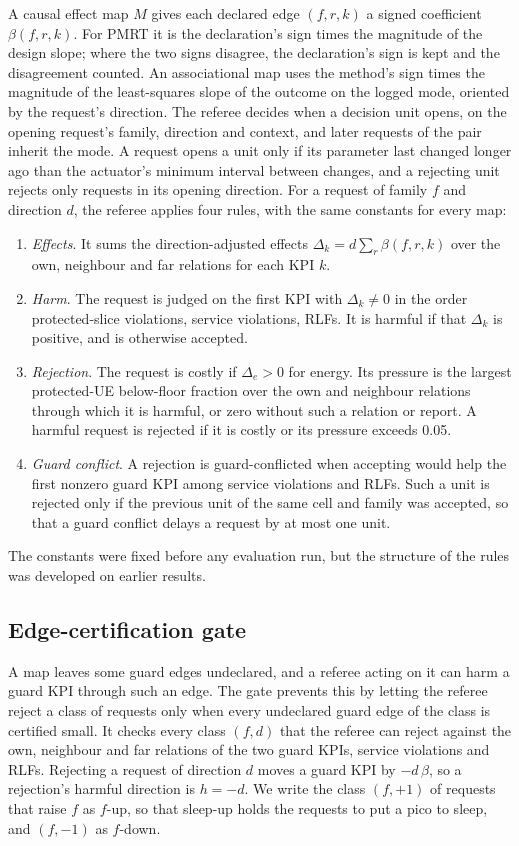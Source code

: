 A causal effect map $M$ gives each declared edge $(f, r, k)$ a signed coefficient $\beta(f, r, k)$. For PMRT it is the
declaration's sign times the magnitude of the design slope; where the two signs disagree, the declaration's sign is
kept and the disagreement counted. An associational map uses the method's sign times the magnitude of the
least-squares slope of the outcome on the logged mode, oriented by the request's direction. The referee decides when a
decision unit opens, on the opening request's family, direction and context, and later requests of the pair inherit
the mode. A request opens a unit only if its parameter last changed longer ago than the actuator's minimum interval
between changes, and a rejecting unit rejects only requests in its opening direction. For a request of family $f$ and
direction $d$, the referee applies four rules, with the same constants for every map:
\begin{enumerate}
\item \emph{Effects}. It sums the direction-adjusted effects $\Delta_k = d \sum_r \beta(f, r, k)$ over the own,
neighbour and far relations for each KPI $k$.
\item \emph{Harm}. The request is judged on the first KPI with $\Delta_k \ne 0$ in the order protected-slice
violations, service violations, RLFs. It is harmful if that $\Delta_k$ is positive, and is otherwise accepted.
\item \emph{Rejection}. The request is costly if $\Delta_e > 0$ for energy. Its pressure is the largest protected-UE
below-floor fraction over the own and neighbour relations through which it is harmful, or zero without such a
relation or report. A harmful request is rejected if it is costly or its pressure exceeds 0.05.
\item \emph{Guard conflict}. A rejection is guard-conflicted when accepting would help the first nonzero guard KPI
among service violations and RLFs. Such a unit is rejected only if the previous unit of the same cell and family was
accepted, so that a guard conflict delays a request by at most one unit.
\end{enumerate}
The constants were fixed before any evaluation run, but the structure of the rules was developed on earlier results.

\subsection{Edge-certification gate}
\label{sec:gate}

A map leaves some guard edges undeclared, and a referee acting on it can harm a guard KPI through such an edge. The
gate prevents this by letting the referee reject a class of requests only when every undeclared guard edge of the
class is certified small. It checks every class $(f, d)$ that the referee can reject against the own, neighbour and far
relations of the two guard KPIs, service violations and RLFs. Rejecting a request of direction $d$ moves a guard KPI
by $-d\,\beta$, so a rejection's harmful direction is $h = -d$. We write the class $(f, +1)$ of requests that raise $f$
as $f$-up, so that sleep-up holds the requests to put a pico to sleep, and $(f, -1)$ as $f$-down.

